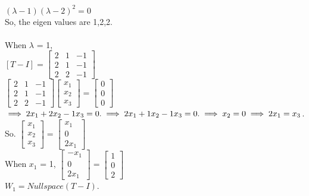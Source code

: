 \documentclass[12pt]{article}
\theoremstyle{definition}
\begin{document}
  $(\lambda-1){(\lambda-2)}^2 = 0$\\
  So, the eigen values are 1,2,2.\\
  \\
  When $\lambda$ = 1,\\
  $
  [T-I] = 
  \begin{bmatrix}
  2 & 1 & -1\\
  2 & 1 & -1\\
  2 & 2 & -1
  \end{bmatrix}
  $ \\
  $
  \begin{bmatrix}
  2 & 1 & -1\\
  2 & 1 & -1\\
  2 & 2 & -1
  \end{bmatrix}
  \begin{bmatrix}
  x_1\\
  x_2\\
  x_3
  \end{bmatrix}
  =
  \begin{bmatrix}
  0\\
  0\\
  0
  \end{bmatrix}
  $ \\
  $\implies
  2x_1+2x_2-1x_3 = 0.\\
  \implies
  2x_1+1x_2-1x_3 = 0.\\
  \implies x_2=0\\
  \implies 2x_1 = x_3$.\\
  So.
  $
  \begin{bmatrix}
  x_1\\
  x_2\\
  x_3
  \end{bmatrix}
  =
  \begin{bmatrix}
  x_1\\
  0\\
  2x_1
  \end{bmatrix}
  $\\
  When $x_1$ = 1,
  $
  \begin{bmatrix}
  -x_1\\
  0\\
  2x_1
  \end{bmatrix}
  =
  \begin{bmatrix}
  1\\
  0\\
  2
  \end{bmatrix}
  $\\
  $W_1 = Nullspace(T-I)$.\\
\end{document}
